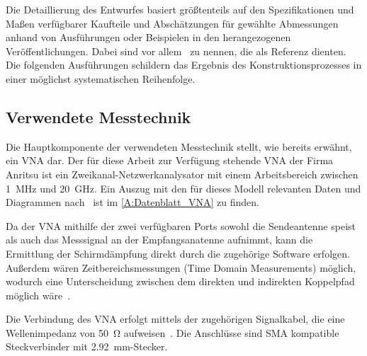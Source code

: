 
Die Detaillierung des Entwurfes basiert größtenteils auf den Spezifikationen und Maßen verfügbarer Kaufteile und Abschätzungen für gewählte Abmessungen anhand von Ausführungen oder Beispielen in den herangezogenen Veröffentlichungen. Dabei sind vor allem~\cite{Design_of_shielded_enclosures, EMV-gerechtes_Geraetedesign, EM_Schirmung, Simplified_shielding, Handbook_Shielding_Materials_and_Performance} zu nennen, die als Referenz dienten. Die folgenden Ausführungen schildern das Ergebnis des Konstruktionsprozesses in einer möglichst systematischen Reihenfolge.

\subsection{Verwendete Messtechnik}

Die Hauptkomponente der verwendeten Messtechnik stellt, wie bereits erwähnt, ein \ac{VNA} dar. Der für diese Arbeit zur Verfügung stehende \ac{VNA} der Firma Anritsu ist ein Zweikanal-Netzwerkanalysator mit einem Arbeitsbereich zwischen \SI{1}{\mega\hertz} und \SI{20}{\giga\hertz}. Ein Auszug mit den für dieses Modell relevanten Daten und Diagrammen nach~\cite{VNA-Datenblatt} ist im \Anhang\ref{A:Datenblatt_VNA} zu finden. 
\par
\vspace{\linespace}
Da der \ac{VNA} mithilfe der zwei verfügbaren Ports sowohl die Sendeantenne speist als auch das Messsignal an der Empfangsanatenne aufnimmt, kann die Ermittlung der Schirmdämpfung direkt durch die zugehörige Software erfolgen. Außerdem wären Zeitbereichsmessungen (Time Domain Measurements) möglich, wodurch eine Unterscheidung zwischen dem direkten und indirekten Koppelpfad möglich wäre~\cite{Techniques_Shielding_Effectiveness_Far_Field_Simulation}. %
\par
\vspace{\linespace}
Die Verbindung des \ac{VNA} erfolgt mittels der zugehörigen Signalkabel, die eine Wellenimpedanz von \SI{50}{\ohm} aufweisen~\cite{Testkabel_VNA-Datenblatt}. Die Anschlüsse sind \ac{SMA} kompatible Steckverbinder mit \SI{2,92}{\milli\meter}-Stecker.
